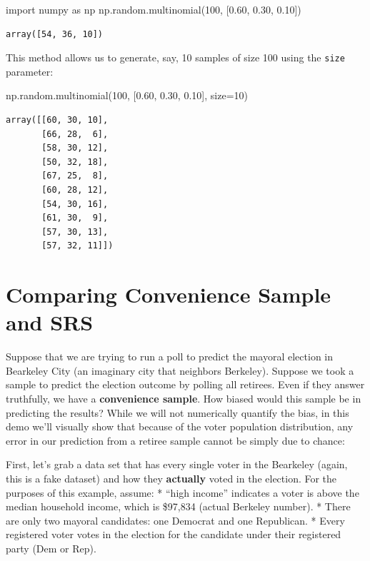 \documentclass[
  letterpaper,
  DIV=11,
  numbers=noendperiod]{scrreprt}
\newenvironment{Shaded}{\begin{snugshade}}{\end{snugshade}}
\newcommand{\DecValTok}[1]{\textcolor[rgb]{0.68,0.00,0.00}{#1}}
\newcommand{\FloatTok}[1]{\textcolor[rgb]{0.68,0.00,0.00}{#1}}
\newcommand{\ImportTok}[1]{\textcolor[rgb]{0.00,0.46,0.62}{#1}}
\newcommand{\NormalTok}[1]{\textcolor[rgb]{0.00,0.23,0.31}{#1}}
\newcommand{\OperatorTok}[1]{\textcolor[rgb]{0.37,0.37,0.37}{#1}}
\begin{document}
\begin{Shaded}
\begin{Highlighting}[]
\ImportTok{import}\NormalTok{ numpy }\ImportTok{as}\NormalTok{ np}
\NormalTok{np.random.multinomial(}\DecValTok{100}\NormalTok{, [}\FloatTok{0.60}\NormalTok{, }\FloatTok{0.30}\NormalTok{, }\FloatTok{0.10}\NormalTok{])}
\end{Highlighting}
\end{Shaded}

\begin{verbatim}
array([54, 36, 10])
\end{verbatim}

This method allows us to generate, say, 10 samples of size 100 using the
\texttt{size} parameter:

\begin{Shaded}
\begin{Highlighting}[]
\NormalTok{np.random.multinomial(}\DecValTok{100}\NormalTok{, [}\FloatTok{0.60}\NormalTok{, }\FloatTok{0.30}\NormalTok{, }\FloatTok{0.10}\NormalTok{], size}\OperatorTok{=}\DecValTok{10}\NormalTok{)}
\end{Highlighting}
\end{Shaded}

\begin{verbatim}
array([[60, 30, 10],
       [66, 28,  6],
       [58, 30, 12],
       [50, 32, 18],
       [67, 25,  8],
       [60, 28, 12],
       [54, 30, 16],
       [61, 30,  9],
       [57, 30, 13],
       [57, 32, 11]])
\end{verbatim}

\hypertarget{comparing-convenience-sample-and-srs}{%
\section{Comparing Convenience Sample and
SRS}\label{comparing-convenience-sample-and-srs}}

Suppose that we are trying to run a poll to predict the mayoral election
in Bearkeley City (an imaginary city that neighbors Berkeley). Suppose
we took a sample to predict the election outcome by polling all
retirees. Even if they answer truthfully, we have a \textbf{convenience
sample}. How biased would this sample be in predicting the results?
While we will not numerically quantify the bias, in this demo we'll
visually show that because of the voter population distribution, any
error in our prediction from a retiree sample cannot be simply due to
chance:

First, let's grab a data set that has every single voter in the
Bearkeley (again, this is a fake dataset) and how they \textbf{actually}
voted in the election. For the purposes of this example, assume: *
``high income'' indicates a voter is above the median household income,
which is \$97,834 (actual Berkeley number). * There are only two mayoral
candidates: one Democrat and one Republican. * Every registered voter
votes in the election for the candidate under their registered party
(Dem or Rep).
\end{document}
